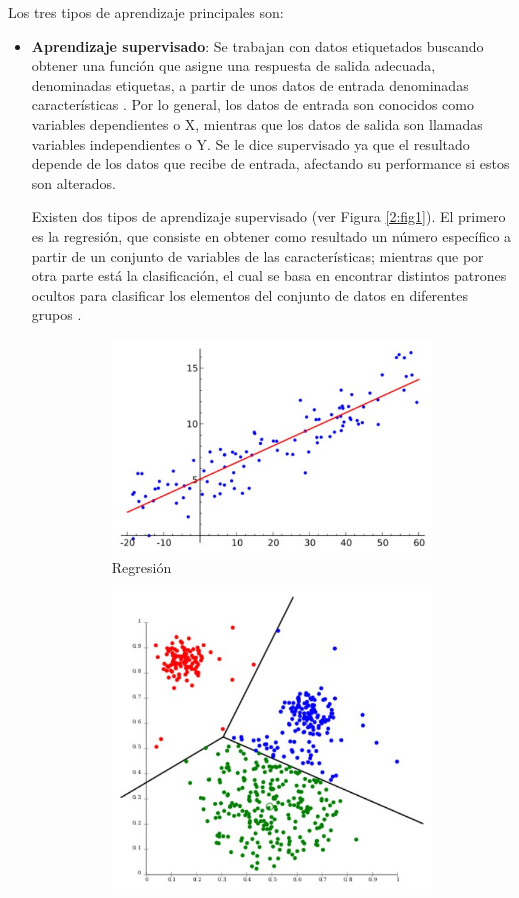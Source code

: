 Los tres tipos de aprendizaje principales son:
\begin{itemize}
	\item \textbf{Aprendizaje supervisado}: Se trabajan con datos etiquetados buscando obtener una función que asigne una respuesta de salida adecuada, denominadas etiquetas, a partir de unos datos de entrada denominadas características \parencite{bk_zambrano2018supnosup}. Por lo general, los datos de entrada son conocidos como variables dependientes o X, mientras que los datos de salida son llamadas variables independientes o Y. Se le dice supervisado ya que el resultado depende de los datos que recibe de entrada, afectando su performance si estos son alterados.
	
	Existen dos tipos de aprendizaje supervisado (ver Figura \ref{2:fig1}). El primero es la regresión, que consiste en obtener como resultado un número específico a partir de un conjunto de variables de las características; mientras que por otra parte está la clasificación, el cual se basa en encontrar distintos patrones ocultos para clasificar los elementos del conjunto de datos en diferentes grupos \parencite{bk_zambrano2018supnosup}.
	\begin{figure}[!ht]
		\centering
		\small
		\begin{subfigure}{.5\textwidth}
			\centering
			\includegraphics[width=0.75\linewidth]{2/figures/regresion.jpg}
			\caption{Regresión}
		\end{subfigure}%
		\begin{subfigure}{.5\textwidth}
			\centering
			\includegraphics[width=0.65\linewidth]{2/figures/clasificacion.jpg}

\end{subfigure}
\end{figure}
\end{itemize}
